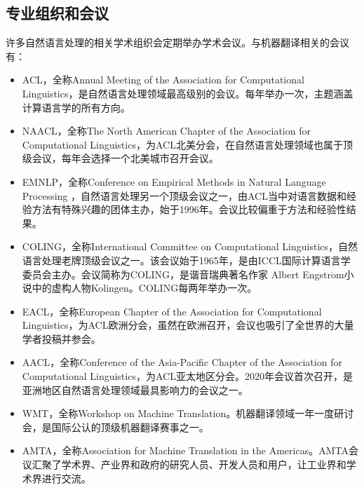 \subsection{专业组织和会议}

许多自然语言处理的相关学术组织会定期举办学术会议。与机器翻译相关的会议有：

\begin{itemize}
\vspace{0.5em}
\item ACL，全称Annual Meeting of the Association for Computational Linguistics，是自然语言处理领域最高级别的会议。每年举办一次，主题涵盖计算语言学的所有方向。
\vspace{0.5em}
\item NAACL，全称The North American Chapter of the Association for Computational Linguistics，为ACL北美分会，在自然语言处理领域也属于顶级会议，每年会选择一个北美城市召开会议。
\vspace{0.5em}
\item EMNLP，全称Conference on Empirical Methods in Natural Language Processing ，自然语言处理另一个顶级会议之一，由ACL当中对语言数据和经验方法有特殊兴趣的团体主办，始于1996年。会议比较偏重于方法和经验性结果。
\vspace{0.5em}
\item COLING，全称International Committee on Computational Linguistics，自然语言处理老牌顶级会议之一。该会议始于1965年，是由ICCL国际计算语言学委员会主办。会议简称为COLING，是谐音瑞典著名作家 Albert Engstr$\ddot{\textrm{o}}$m小说中的虚构人物Kolingen。COLING每两年举办一次。
\vspace{0.5em}
\item EACL，全称European Chapter of the Association for Computational Linguistics，为ACL欧洲分会，虽然在欧洲召开，会议也吸引了全世界的大量学者投稿并参会。
\vspace{0.5em}
\item AACL，全称Conference of the Asia-Pacific Chapter of the Association for Computational Linguistics，为ACL亚太地区分会。2020年会议首次召开，是亚洲地区自然语言处理领域最具影响力的会议之一。
\vspace{0.5em}
\item WMT，全称Workshop on Machine Translation。机器翻译领域一年一度研讨会，是国际公认的顶级机器翻译赛事之一。
\vspace{0.5em}
\item AMTA，全称Association for Machine Translation in the Americas。AMTA会议汇聚了学术界、产业界和政府的研究人员、开发人员和用户，让工业界和学术界进行交流。
\vspace{0.5em}

\end{itemize}
